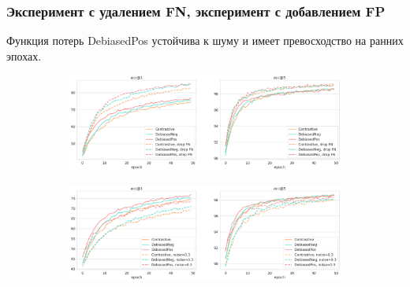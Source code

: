 \documentclass[
	11pt, %
	t, %
        russian
]{beamer}
\begin{document}
\begin{frame}
    \frametitle{\small Эксперимент с удалением FN, эксперимент с добавлением FP}

\scriptsize
Функция потерь DebiasedPos устойчива к шуму и имеет превосходство на ранних эпохах.

\begin{figure}
\centering
\begin{subfigure}
  \centering
  \includegraphics[width=0.87\linewidth]{Images/base_vs_dropfn.png}
  \label{fig:sub1}
\end{subfigure}%

\begin{subfigure}
  \centering
  \hspace*{+0.22cm}\includegraphics[width=0.87\linewidth]{Images/base_vs_noise.png}
  \label{fig:sub2}
\end{subfigure}
\label{fig:test}
\end{figure}


	
\end{frame}
\end{document}
